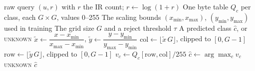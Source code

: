 
\begin{algorithm}[!ht]
\caption{Table-lookup classification (online path).}
\label{alg:classify}
\begin{algorithmic}[1]
\Require raw query $(u, r)$ with $r$ the IR count; $r \leftarrow \log(1+r)$
\Require One byte table $Q_c$ per class, each $G \times G$, values 0--255
\Require The scaling bounds $(x_{\min}, x_{\max})$, $(y_{\min}, y_{\max})$ used in training
\Require The grid size $G$ and a reject threshold $\tau$
\Ensure A predicted class $\hat{c}$, or \textsc{unknown}
\State $\tilde{x} \gets \dfrac{x - x_{\min}}{x_{\max} - x_{\min}}$, \quad $\tilde{y} \gets \dfrac{y - y_{\min}}{y_{\max} - y_{\min}}$
\State $\text{col} \gets \lfloor \tilde{x} \, G \rfloor$, clipped to $[0, G-1]$
\State $\text{row} \gets \lfloor \tilde{y} \, G \rfloor$, clipped to $[0, G-1]$
    \State $v_c \gets Q_c[\text{row}, \text{col}] / 255$ 
\EndFor
\State $\hat{c} \gets \arg\max_c v_c$ 
    \State \Return \textsc{unknown} 
\EndIf
\State \Return $\hat{c}$
\end{algorithmic}
\end{algorithm}